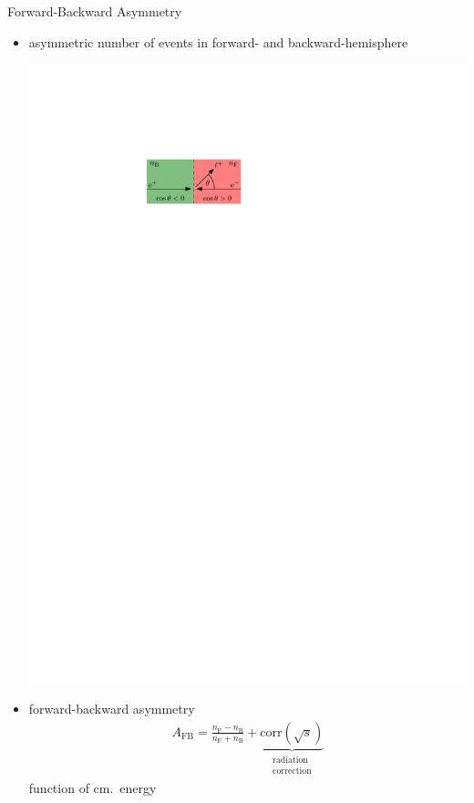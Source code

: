 \documentclass[11pt,xcolor=dvipsnames,professionalfonts]{beamer}
\begin{document}
\begin{frame}{Forward-Backward Asymmetry}
	\begin{itemize}
		\setlength\itemsep{1.5em}
		\item<1-> asymmetric number of events in forward- and backward-hemisphere
		\begin{center}
			\vspace{0.2cm}
			\includegraphics[scale=1.3]{./talkfigs/pdf/afb_theta.pdf}
		\end{center}
			
		
		
		\item<2-> forward-backward asymmetry
			\begin{align*}
				A_\mathrm{FB} = \frac{n_\mathrm{F} - n_\mathrm{B}}{n_\mathrm{F} + n_\mathrm{B}} + \underbrace{\mathrm{corr}(\sqrt{s})}_{\substack{\text{radiation} \\ \text{correction}}}
			\end{align*}
			function of cm.\ energy
	\end{itemize}
\end{frame}
\end{document}
